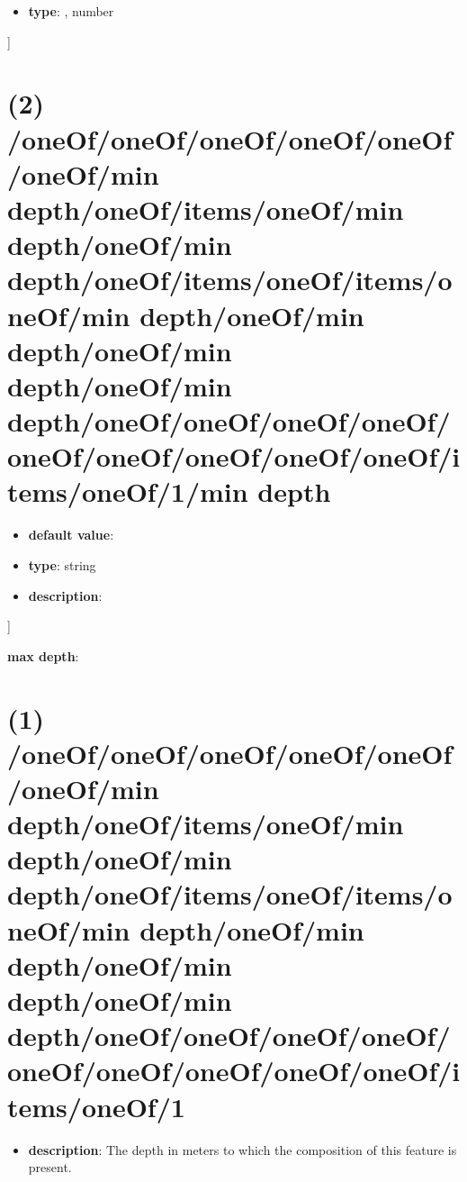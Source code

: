 \begin{itemize}[leftmargin=7em]\item {\bf type}: , number\end{itemize}]\section{(2) /oneOf/oneOf/oneOf/oneOf/oneOf/oneOf/min depth/oneOf/items/oneOf/min depth/oneOf/min depth/oneOf/items/oneOf/items/oneOf/min depth/oneOf/min depth/oneOf/min depth/oneOf/min depth/oneOf/oneOf/oneOf/oneOf/oneOf/oneOf/oneOf/oneOf/oneOf/items/oneOf/1/min depth}
\begin{itemize}[leftmargin=2em]\item {\bf default value}: 
\item {\bf type}: string
\item {\bf description}: 
\end{itemize}]\item {\bf max depth}: \section{(1) /oneOf/oneOf/oneOf/oneOf/oneOf/oneOf/min depth/oneOf/items/oneOf/min depth/oneOf/min depth/oneOf/items/oneOf/items/oneOf/min depth/oneOf/min depth/oneOf/min depth/oneOf/min depth/oneOf/oneOf/oneOf/oneOf/oneOf/oneOf/oneOf/oneOf/oneOf/items/oneOf/1}
\begin{itemize}[leftmargin=1em]\item {\bf description}: The depth in meters to which the composition of this feature is present.
\end{itemize}
